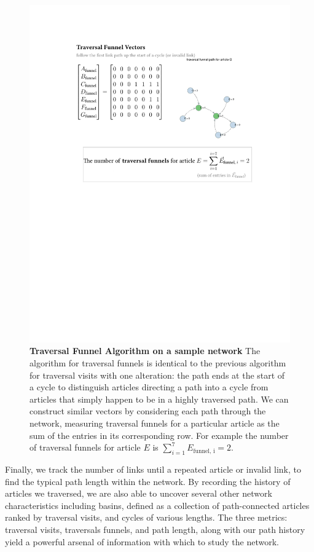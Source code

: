 \documentclass[pre,twocolumn,twoside,superscriptaddress,floatfix, aps, 10pt]{revtex4-1}
\begin{document}
\begin{figure}[tp!]
  \centering	
  \includegraphics[width=\columnwidth]{graphics/traversal_funnel_algo_figure.pdf}
  \caption{
    \textbf{Traversal Funnel Algorithm on a sample network}
  The algorithm for traversal funnels is identical to the previous algorithm for traversal visits with one alteration: the path ends at the start of a cycle to distinguish articles directing a path into a cycle from articles that simply happen to be in a highly traversed path. We can construct similar vectors by considering each path through the network, measuring traversal funnels for a particular article as the sum of the entries in its corresponding row. For example
  the number of traversal funnels for article $E$ is 
  $\sum_{i=1}^7 E_{\text{funnel, i}} = 2$.}
  \label{fig:Traversal Funnels}

\end{figure}

Finally, we track the number of links until a repeated article or invalid link, to find the typical path length within the network.
By recording the history of articles we traversed, we are also able to uncover several other network characteristics including basins, defined as a collection of path-connected articles ranked by traversal visits, and cycles of various lengths.
The three metrics: traversal visits, traversals funnels, and path length, along with our path history
yield a powerful arsenal of information with which to study the network. 
\end{document}
